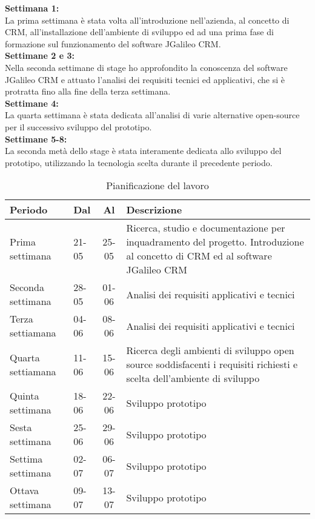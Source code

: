 \textbf{Settimana 1:}\\
La prima settimana è stata volta all'introduzione nell'azienda, al concetto di CRM, all'installazione dell'ambiente di sviluppo ed ad una prima fase di formazione sul funzionamento del software JGalileo CRM.\\
\textbf{Settimane 2 e 3:}\\
Nella seconda settimane di stage ho approfondito la conoscenza del software JGalileo CRM e attuato l'analisi dei requisiti tecnici ed applicativi, che si è protratta fino alla fine della terza settimana.\\
\textbf{Settimane 4:}\\
La quarta settimana è stata dedicata all'analisi di varie alternative open-source per il successivo sviluppo del prototipo. \\
\textbf{Settimane 5-8:}\\
La seconda metà dello stage è stata interamente dedicata allo sviluppo del prototipo, utilizzando la tecnologia scelta durante il precedente periodo.\\

\begin{table}[h]
\centering
\caption{Pianificazione del lavoro}
\label{tab:pianificazione-del-lavoro}
\begin{tabular}{|l|l|c|p{7cm}|}
\hline
Periodo  & Dal & Al &Descrizione\\
\hline
Prima settimana  & 21-05 & 25-05 & Ricerca, studio e documentazione per inquadramento del
progetto.
Introduzione al concetto di CRM ed al software JGalileo CRM\\
\hline
Seconda settimana  & 28-05 & 01-06 & Analisi dei requisiti applicativi e tecnici\\
\hline
Terza settiamana & 04-06 & 08-06 &Analisi dei requisiti applicativi e tecnici\\
\hline
Quarta settiamana  & 11-06 & 15-06 & Ricerca degli ambienti di sviluppo open source soddisfacenti i requisiti richiesti e scelta dell’ambiente di sviluppo\\
\hline
Quinta settimana  & 18-06 & 22-06 & Sviluppo prototipo\\
\hline
Sesta settimana  & 25-06 & 29-06 & Sviluppo prototipo\\
\hline
Settima settimana  & 02-07 & 06-07 &Sviluppo prototipo\\
\hline
Ottava settimana  & 09-07 & 13-07 &Sviluppo prototipo\\
\hline
\end{tabular}
\end{table}

